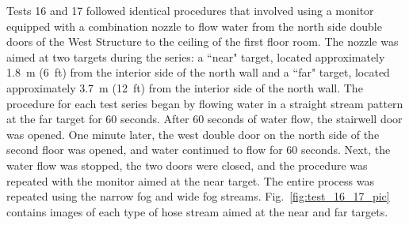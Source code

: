 \documentclass[12pt,oneside]{book}
\begin{document}
Tests 16 and 17 followed identical procedures that involved using a monitor equipped with a combination nozzle to flow water from the north side double doors of the West Structure to the ceiling of the first floor room. The nozzle was aimed at two targets during the series: a ``near" target, located approximately 1.8~m (6~ft) from the interior side of the north wall and a ``far" target, located approximately 3.7~m (12~ft) from the interior side of the north wall. The procedure for each test series began by flowing water in a straight stream pattern at the far target for 60 seconds. After 60 seconds of water flow, the stairwell door was opened. One minute later, the west double door on the north side of the second floor was opened, and water continued to flow for 60 seconds. Next, the water flow was stopped, the two doors were closed, and the procedure was repeated with the monitor aimed at the near target. The entire process was repeated using the narrow fog and wide fog streams. Fig.~\ref{fig:test_16_17_pic} contains images of each type of hose stream aimed at the near and far targets.
\end{document}
